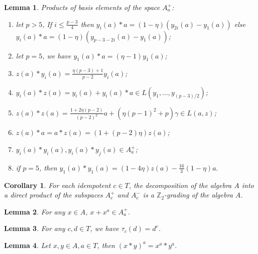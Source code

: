 \documentclass[10pt,a4paper]{amsart}
\newtheorem{lem}{Lemma}
\newtheorem{cor}{Corollary}
\newcommand\Z{\mathbb{Z}}
\newcommand\gam{\gamma}
\begin{document}
\begin{lem}\label{prod1}
Products of basis elements of the space $A_a^+$:
\begin{enumerate}
\item let $p>5$, If $i\leq \frac{p-3}{4}$ then $y_i(a)*a=(1-\eta)(y_{2i}(a)-y_1(a))$ else $y_i(a)*a=(1-\eta)(y_{p-3-2i}(a)-y_1(a))$;

\item let $p=5$, we have $y_1(a)*a=(\eta-1)y_1(a)$;

\item $z(a)*y_i(a)= \frac{\eta(p-3)+1}{p-2}y_i(a)$;

\item $y_i(a)*z(a)=y_i(a)+y_i(a)*a\in L(y_1,...,y_{(p-3)/2})$;

\item $z(a)*z(a)=\frac{1+2\eta(p-2)}{(p-2)^2}a+(\eta(p-1)^2+p)\gam\in L(a,z)$; 

\item $z(a)*a=a*z(a)=(1+(p-2)\eta)z(a)$;

\item $y_i(a)*y_i(a), y_i(a)*y_j(a)\in A_a^+$;

\item if $p=5$, then $y_1(a)*y_1(a)=(1-4\eta)z(a)-\frac{16}{3}(1-\eta)a.$ 
\end{enumerate}
\end{lem}

\begin{cor}\label{twogenaxial}
	For each idempotent $c\in T$, the decomposition of the algebra $A$ into a direct product of the subspaces $A^+_c$ and $A^-_c$ is a $\Z_2$-grading of the algebra $A$.
\end{cor}

\begin{lem}\label{xxa}
For any $x\in A$, $x+x^a\in A^+_a$.
\end{lem}

\begin{lem}\label{Mi2}
	For any $c,d\in T$, we have $\tau_c(d)=d^c$.
\end{lem}

\begin{lem}\label{aaut}
	Let $x,y\in A, a\in T$, then $(x*y)^a=x^a*y^a$.
\end{lem}
\end{document}

